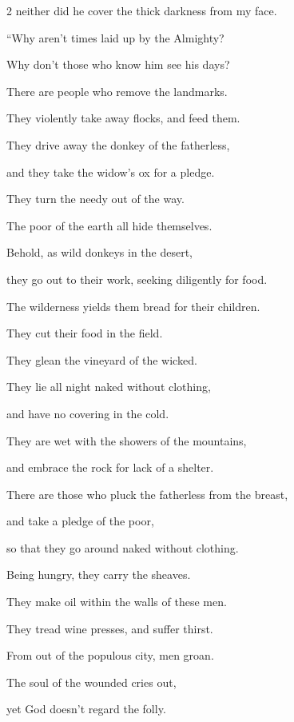 \begin{multicols}{2}
	neither did he cover the thick darkness from my face.
	
	
	
	
	\mychapter{} \myverse*{}“Why aren’t times laid up by the Almighty?
	
	\quad\quad Why don’t those who know him see his days?
	
	\myverse{}There are people who remove the landmarks.
	
	They violently take away flocks, and feed them.
	
	\myverse{}They drive away the donkey of the fatherless,
	
	and they take the widow’s ox for a pledge.
	
	\myverse{}They turn the needy out of the way.
	
	The poor of the earth all hide themselves.
	
	\myverse{}Behold, as wild donkeys in the desert,
	
	they go out to their work, seeking diligently for food.
	
	The wilderness yields them bread for their children.
	
	\myverse{}They cut their food in the field.
	
	They glean the vineyard of the wicked.
	
	\myverse{}They lie all night naked without clothing,
	
	and have no covering in the cold.
	
	\myverse{}They are wet with the showers of the mountains,
	
	and embrace the rock for lack of a shelter.
	
	\myverse{}There are those who pluck the fatherless from the breast,
	
	and take a pledge of the poor,
	
	\myverse{}so that they go around naked without clothing.
	
	Being hungry, they carry the sheaves.
	
	\myverse{}They make oil within the walls of these men.
	
	They tread wine presses, and suffer thirst.
	
	\myverse{}From out of the populous city, men groan.
	
	The soul of the wounded cries out,
	
	yet God doesn’t regard the folly.
	
		\vspace{\baselineskip}
	

\end{multicols}
